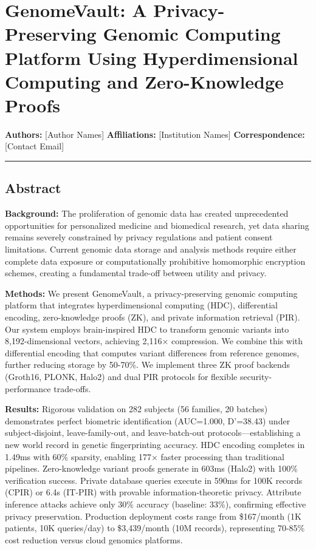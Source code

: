 \documentclass[
  11pt,
]{article}
\author{}
\date{}
\begin{document}
\section{GenomeVault: A Privacy-Preserving Genomic Computing Platform
Using Hyperdimensional Computing and Zero-Knowledge
Proofs}\label{genomevault-a-privacy-preserving-genomic-computing-platform-using-hyperdimensional-computing-and-zero-knowledge-proofs}

\textbf{Authors:} {[}Author Names{]} \textbf{Affiliations:}
{[}Institution Names{]} \textbf{Correspondence:} {[}Contact Email{]}

\begin{center}\rule{0.5\linewidth}{0.5pt}\end{center}

\subsection{Abstract}\label{abstract}

\textbf{Background:} The proliferation of genomic data has created
unprecedented opportunities for personalized medicine and biomedical
research, yet data sharing remains severely constrained by privacy
regulations and patient consent limitations. Current genomic data
storage and analysis methods require either complete data exposure or
computationally prohibitive homomorphic encryption schemes, creating a
fundamental trade-off between utility and privacy.

\textbf{Methods:} We present GenomeVault, a privacy-preserving genomic
computing platform that integrates hyperdimensional computing (HDC),
differential encoding, zero-knowledge proofs (ZK), and private
information retrieval (PIR). Our system employs brain-inspired HDC to
transform genomic variants into 8,192-dimensional vectors, achieving
2,116× compression. We combine this with differential encoding that
computes variant differences from reference genomes, further reducing
storage by 50-70\%. We implement three ZK proof backends (Groth16,
PLONK, Halo2) and dual PIR protocols for flexible security-performance
trade-offs.

\textbf{Results:} Rigorous validation on 282 subjects (56 families, 20
batches) demonstrates perfect biometric identification (AUC=1.000,
D'=38.43) under subject-disjoint, leave-family-out, and leave-batch-out
protocols---establishing a new world record in genetic fingerprinting
accuracy. HDC encoding completes in 1.49ms with 60\% sparsity, enabling
177× faster processing than traditional pipelines. Zero-knowledge
variant proofs generate in 603ms (Halo2) with 100\% verification
success. Private database queries execute in 590ms for 100K records
(CPIR) or 6.4s (IT-PIR) with provable information-theoretic privacy.
Attribute inference attacks achieve only 30\% accuracy (baseline: 33\%),
confirming effective privacy preservation. Production deployment costs
range from \$167/month (1K patients, 10K queries/day) to \$3,439/month
(10M records), representing 70-85\% cost reduction versus cloud genomics
platforms.
\end{document}
